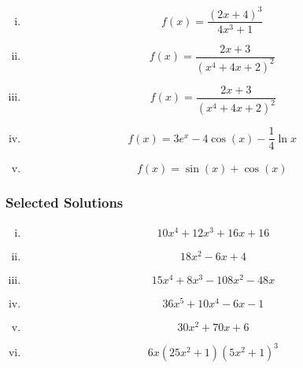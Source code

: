\documentclass[]{article}
\begin{document}
\begin{multicols}{2}
\begin{enumerate}[(i)]
		\item 		 \[ f(x) = \frac{(2x+4)^3}{4x^3+1} \,\] %
		\item 		\[ f(x) = \frac{2x+3}{(x^4+4x+2)^2} \,\] 
		\item \[f(x) = \frac{2x+3}{(x^4+4x+2)^2}\]
		
		\item  \[f(x) = 3e^x-4\cos (x) - \frac{1}{4}\ln x\,\]
		\item \[f(x) = \sin(x)+\cos(x)\,\]
		
	\end{enumerate}
\end{multicols}

\subsubsection*{Selected Solutions}
\begin{multicols}{2}
	\begin{enumerate}[(i)]
		\item		 \[ 10x^4+12x^3+16x+16\]
		\item			 \[ 18x^2-6x+4\]
		\item	 \[ 15x^4+8x^3-108x^2-48x\]
		\item		 \[ 36x^5+10x^4-6x-1\]
		\item		 \[ 30x^2+70x+6\]
		\item		 \[ 6x(25x^2+1)(5x^2+1)^3\]
	\end{enumerate}
\end{multicols}

\newpage		
\end{document}
